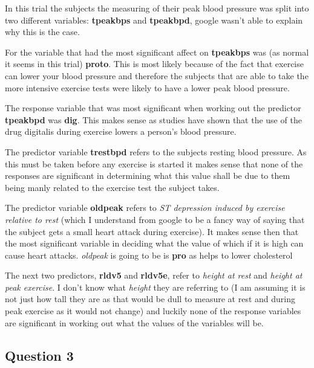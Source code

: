 \documentclass[a4paper]{article}
\begin{document}
\newpage
In this trial the subjects the measuring of their peak blood pressure was split
into two different variables: \textbf{tpeakbps} and \textbf{tpeakbpd}, google
wasn't able to explain why this is the case.

For the variable that had the most significant affect on \textbf{tpeakbps} was
(as normal it seems in this trial) \textbf{proto}. This is most likely because
of the fact that exercise can lower your blood pressure and therefore the
subjects that are able to take the more intensive exercise tests were likely to
have a lower peak blood pressure.

\newpage

The response variable that was most significant when working out the predictor
\textbf{tpeakbpd} was \textbf{dig}.  This makes sense as studies have shown that
the use of the drug digitalis during exercise lowers a person's blood pressure.

\newpage

The predictor variable \textbf{trestbpd} refers to the subjects resting blood
pressure. As this must be taken before any exercise is started it makes sense
that none of the responses are significant in determining what this value shall
be due to them being manly related to the exercise test the subject takes.

\newpage

The predictor variable \textbf{oldpeak} refers to \textit{ST depression induced
by exercise relative to rest} (which I understand from google to be a fancy way
of saying that the subject gets a small heart attack during exercise). It makes
sense then that the most significant variable in deciding what the value of
which if it is high can cause heart attacks.
\textit{oldpeak} is going to be is \textbf{pro} as helps to lower cholesterol

\newpage
The next two predictors, \textbf{rldv5} and \textbf{rldv5e}, refer to
\textit{height at rest} and \textit{height at peak exercise}. I don't know what
\textit{height} they are referring to (I am assuming it is not just how tall
they are as that would be dull to measure at rest and during peak exercise as it
would not change) and luckily none of the response variables are significant in
working out what the values of the variables will be.



\newpage
\subsection{Question 3}
\end{document}
